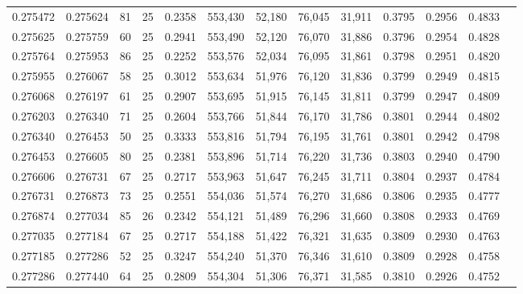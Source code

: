 \begin{tabular}{rrrrrrrrrrrrr}
0.275472 & 0.275624 &    81 &  25 &                                     0.2358 & 553,430 &  52,180 &  76,045 &  31,911 & 0.3795 & 0.2956 & 0.4833 \\
0.275625 & 0.275759 &    60 &  25 &                                     0.2941 & 553,490 &  52,120 &  76,070 &  31,886 & 0.3796 & 0.2954 & 0.4828 \\
0.275764 & 0.275953 &    86 &  25 &                                     0.2252 & 553,576 &  52,034 &  76,095 &  31,861 & 0.3798 & 0.2951 & 0.4820 \\
0.275955 & 0.276067 &    58 &  25 &                                     0.3012 & 553,634 &  51,976 &  76,120 &  31,836 & 0.3799 & 0.2949 & 0.4815 \\
0.276068 & 0.276197 &    61 &  25 &                                     0.2907 & 553,695 &  51,915 &  76,145 &  31,811 & 0.3799 & 0.2947 & 0.4809 \\
0.276203 & 0.276340 &    71 &  25 &                                     0.2604 & 553,766 &  51,844 &  76,170 &  31,786 & 0.3801 & 0.2944 & 0.4802 \\
0.276340 & 0.276453 &    50 &  25 &                                     0.3333 & 553,816 &  51,794 &  76,195 &  31,761 & 0.3801 & 0.2942 & 0.4798 \\
0.276453 & 0.276605 &    80 &  25 &                                     0.2381 & 553,896 &  51,714 &  76,220 &  31,736 & 0.3803 & 0.2940 & 0.4790 \\
0.276606 & 0.276731 &    67 &  25 &                                     0.2717 & 553,963 &  51,647 &  76,245 &  31,711 & 0.3804 & 0.2937 & 0.4784 \\
0.276731 & 0.276873 &    73 &  25 &                                     0.2551 & 554,036 &  51,574 &  76,270 &  31,686 & 0.3806 & 0.2935 & 0.4777 \\
0.276874 & 0.277034 &    85 &  26 &                                     0.2342 & 554,121 &  51,489 &  76,296 &  31,660 & 0.3808 & 0.2933 & 0.4769 \\
0.277035 & 0.277184 &    67 &  25 &                                     0.2717 & 554,188 &  51,422 &  76,321 &  31,635 & 0.3809 & 0.2930 & 0.4763 \\
0.277185 & 0.277286 &    52 &  25 &                                     0.3247 & 554,240 &  51,370 &  76,346 &  31,610 & 0.3809 & 0.2928 & 0.4758 \\
0.277286 & 0.277440 &    64 &  25 &                                     0.2809 & 554,304 &  51,306 &  76,371 &  31,585 & 0.3810 & 0.2926 & 0.4752 \\

\end{tabular}
